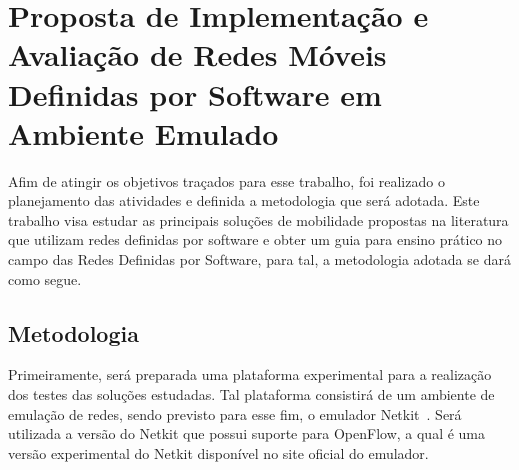 \documentclass[	12pt, Times, openright, twoside, a4paper, english, brazil]{abntex2}
\begin{document}


\chapter{Proposta de Implementação e Avaliação de Redes Móveis Definidas por Software em Ambiente Emulado}
\label{cap:trabalho}


Afim de atingir os objetivos traçados para esse trabalho, foi realizado o planejamento das atividades e definida a metodologia que será adotada. Este trabalho visa estudar as principais soluções de mobilidade propostas na literatura que utilizam redes definidas por software e obter um guia para ensino prático no campo das Redes Definidas por Software, para tal, a metodologia adotada se dará como segue.

\section{Metodologia}


Primeiramente, será preparada uma plataforma experimental para a realização dos testes das soluções estudadas. Tal plataforma consistirá de um ambiente de emulação de redes, sendo previsto para esse fim, o emulador Netkit~\cite{Pizzonia}. Será utilizada a versão do Netkit que possui suporte para OpenFlow, a qual é uma versão experimental do Netkit disponível no site oficial do emulador. 
\end{document}
